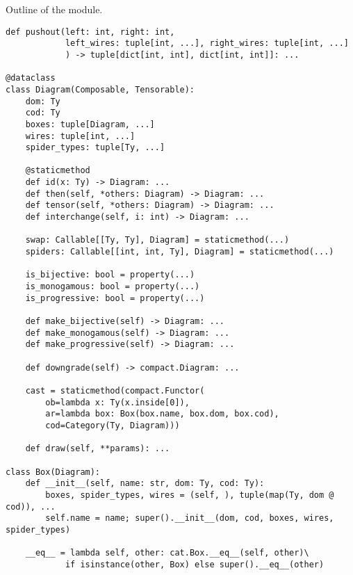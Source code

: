 \begin{python}\label{listing:discopy-hypergraph}
{\normalfont Outline of the  module.}

\begin{verbatim}
def pushout(left: int, right: int,
            left_wires: tuple[int, ...], right_wires: tuple[int, ...]
            ) -> tuple[dict[int, int], dict[int, int]]: ...

@dataclass
class Diagram(Composable, Tensorable):
    dom: Ty
    cod: Ty
    boxes: tuple[Diagram, ...]
    wires: tuple[int, ...]
    spider_types: tuple[Ty, ...]

    @staticmethod
    def id(x: Ty) -> Diagram: ...
    def then(self, *others: Diagram) -> Diagram: ...
    def tensor(self, *others: Diagram) -> Diagram: ...
    def interchange(self, i: int) -> Diagram: ...

    swap: Callable[[Ty, Ty], Diagram] = staticmethod(...)
    spiders: Callable[[int, int, Ty], Diagram] = staticmethod(...)

    is_bijective: bool = property(...)
    is_monogamous: bool = property(...)
    is_progressive: bool = property(...)

    def make_bijective(self) -> Diagram: ...
    def make_monogamous(self) -> Diagram: ...
    def make_progressive(self) -> Diagram: ...

    def downgrade(self) -> compact.Diagram: ...

    cast = staticmethod(compact.Functor(
        ob=lambda x: Ty(x.inside[0]),
        ar=lambda box: Box(box.name, box.dom, box.cod),
        cod=Category(Ty, Diagram)))

    def draw(self, **params): ...

class Box(Diagram):
    def __init__(self, name: str, dom: Ty, cod: Ty):
        boxes, spider_types, wires = (self, ), tuple(map(Ty, dom @ cod)), ...
        self.name = name; super().__init__(dom, cod, boxes, wires, spider_types)

    __eq__ = lambda self, other: cat.Box.__eq__(self, other)\
            if isinstance(other, Box) else super().__eq__(other)
\end{verbatim}
\end{python}

